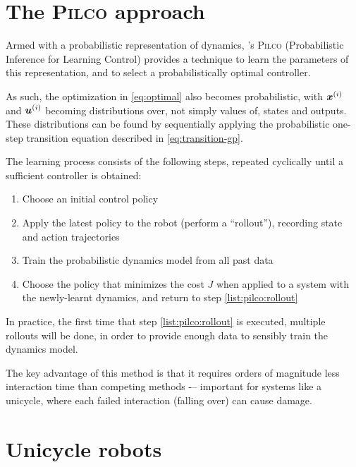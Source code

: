 \documentclass[main.tex]{subfiles}
\begin{document}
\section{The \textsc{Pilco} approach}

	Armed with a probabilistic representation of dynamics, \citeauthor{pilco}'s \textsc{Pilco} \cite{pilco} (Probabilistic Inference for Learning Control) provides a technique to learn the parameters of this representation, and to select a probabilistically optimal controller.

	As such, the optimization in \cref{eq:optimal} also becomes probabilistic\footnotemark, with $\bm{x}^{(i)}$ and $\bm{u}^{(i)}$ becoming distributions over, not simply values of, states and outputs. These distributions can be found by sequentially applying the probabilistic one-step transition equation described in \cref{eq:transition-gp}.


	The learning process consists of the following steps, repeated cyclically until a sufficient controller is obtained:
	\begin{enumerate}[nosep]
		\item Choose an initial control policy
		\item Apply the latest policy to the robot (perform a \enquote{rollout}), recording state and action trajectories \label{list:pilco:rollout}
		\item Train the probabilistic dynamics model from all past data
		\item Choose the policy that minimizes the cost $J$ when applied to a system with the newly-learnt dynamics, and return to step \ref{list:pilco:rollout}
	\end{enumerate}
	In practice, the first time that step \ref{list:pilco:rollout} is executed, multiple rollouts will be done, in order to provide enough data to sensibly train the dynamics model.

	The key advantage of this method is that it requires orders of magnitude less interaction time \cite{pilco} than competing methods -– important for systems like a unicycle, where each failed interaction (falling over) can cause damage.

\section{Unicycle robots}
\end{document}
